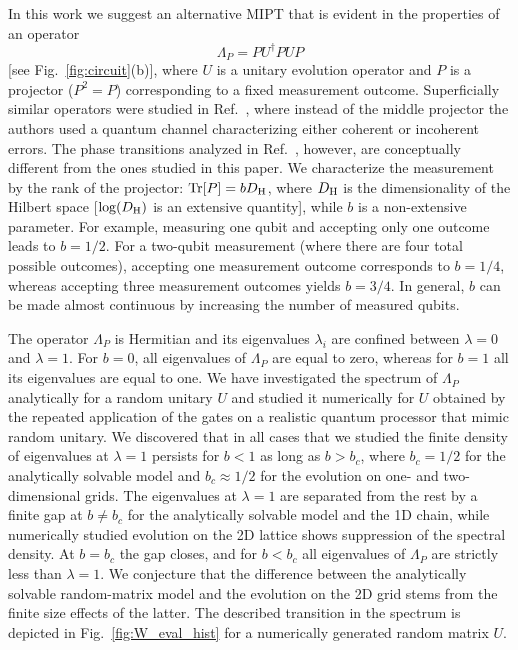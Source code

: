 \documentclass[%
 reprint,
 superscriptaddress,
 amsmath,amssymb,
prx,
]{revtex4-2}\href{\href{}{}}{}
\begin{document}
In this work we suggest an alternative MIPT that is evident in the properties of an operator 
\begin{equation}
    \Lambda_P = P U^{\dagger} P U P
    \label{eq:Lambda_P}
\end{equation}
[see Fig.~\ref{fig:circuit}(b)], where $U$ is a unitary evolution operator and $P$ is a projector ($P^2=P$) corresponding to a fixed measurement outcome. Superficially similar operators were studied in Ref.~\cite{Turkeshi2024}, where instead of the middle projector the authors used a quantum channel characterizing either coherent or incoherent errors. The phase transitions analyzed in Ref.~\cite{Turkeshi2024}, however, are conceptually different from the ones studied in this paper.
We characterize the measurement by the rank of the projector: $\Tr[P]=bD_{\rm H}$, where $D_{\rm H}$ is the dimensionality of the Hilbert space [$\log(D_{\rm H})$ is an extensive quantity], while $b$ is a non-extensive parameter.
For example, measuring one qubit and accepting only one outcome leads to $b=1/2$.
For a two-qubit measurement (where there are four total possible outcomes), accepting one measurement outcome corresponds to $b=1/4$, whereas accepting three measurement outcomes yields $b=3/4$.
In general, $b$ can be made almost continuous by increasing the number of measured qubits.

The operator $\Lambda_P$ is Hermitian and its eigenvalues $\lambda_i$ are confined between $\lambda=0$ and $\lambda=1$.
For $b=0$, all eigenvalues of $\Lambda_P$ are equal to zero, whereas for $b=1$ all its eigenvalues are equal to one.
We have investigated the spectrum of $\Lambda_P$ analytically for a random unitary $U$ and studied it numerically for $U$ obtained by the repeated application of the gates on a realistic quantum processor that mimic random unitary.
We discovered that in all cases that we studied the finite density of eigenvalues at $\lambda=1$ persists for $b<1$ as long as $b>b_c$, where $b_c=1/2$ for the analytically solvable model and $b_c\approx 1/2$ for the evolution on one- and two-dimensional grids. The eigenvalues at $\lambda=1$ are separated from the rest by a finite gap at $b\neq b_c$  for the analytically solvable model and the 1D chain, while numerically studied evolution on the 2D lattice shows suppression of the spectral density. 
At $b=b_c$ the gap closes, and for $b<b_c$ all eigenvalues of $\Lambda_P$ are strictly less than $\lambda=1$. We conjecture that the difference between the analytically solvable random-matrix model and the evolution on the 2D grid stems from the finite size effects of the latter. 
The described transition in the spectrum is depicted in Fig.~\ref{fig:W_eval_hist} for a numerically generated random matrix $U$.
\end{document}

